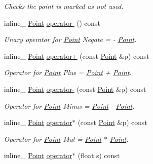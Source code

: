 \begin{DoxyCompactItemize}
\begin{DoxyCompactList}\small\item\em Checks the point is marked as not used. \end{DoxyCompactList}\item 
\hypertarget{class_point_a315d9824eea49c0d240cb9591ee97024}{inline\+\_\+ \hyperlink{class_point}{Point} \hyperlink{class_point_a315d9824eea49c0d240cb9591ee97024}{operator-\/} () const }\label{class_point_a315d9824eea49c0d240cb9591ee97024}

\begin{DoxyCompactList}\small\item\em Unary operator for \hyperlink{class_point}{Point} Negate = -\/ \hyperlink{class_point}{Point}. \end{DoxyCompactList}\item 
\hypertarget{class_point_ae75aa36bd4be5dbcfe682a063927fbf1}{inline\+\_\+ \hyperlink{class_point}{Point} \hyperlink{class_point_ae75aa36bd4be5dbcfe682a063927fbf1}{operator+} (const \hyperlink{class_point}{Point} \&p) const }\label{class_point_ae75aa36bd4be5dbcfe682a063927fbf1}

\begin{DoxyCompactList}\small\item\em Operator for \hyperlink{class_point}{Point} Plus = \hyperlink{class_point}{Point} + \hyperlink{class_point}{Point}. \end{DoxyCompactList}\item 
\hypertarget{class_point_a0cfa198d4ba252ff0a5ea2e0ce5d3a2a}{inline\+\_\+ \hyperlink{class_point}{Point} \hyperlink{class_point_a0cfa198d4ba252ff0a5ea2e0ce5d3a2a}{operator-\/} (const \hyperlink{class_point}{Point} \&p) const }\label{class_point_a0cfa198d4ba252ff0a5ea2e0ce5d3a2a}

\begin{DoxyCompactList}\small\item\em Operator for \hyperlink{class_point}{Point} Minus = \hyperlink{class_point}{Point} -\/ \hyperlink{class_point}{Point}. \end{DoxyCompactList}\item 
\hypertarget{class_point_a0bad2f6e7e2caf7a0e639f3ba0f9bbc8}{inline\+\_\+ \hyperlink{class_point}{Point} \hyperlink{class_point_a0bad2f6e7e2caf7a0e639f3ba0f9bbc8}{operator$\ast$} (const \hyperlink{class_point}{Point} \&p) const }\label{class_point_a0bad2f6e7e2caf7a0e639f3ba0f9bbc8}

\begin{DoxyCompactList}\small\item\em Operator for \hyperlink{class_point}{Point} Mul = \hyperlink{class_point}{Point} $\ast$ \hyperlink{class_point}{Point}. \end{DoxyCompactList}\item 
\hypertarget{class_point_a4b3ce25b1180271c2bc7b33bd2755160}{inline\+\_\+ \hyperlink{class_point}{Point} \hyperlink{class_point_a4b3ce25b1180271c2bc7b33bd2755160}{operator$\ast$} (float s) const }\label{class_point_a4b3ce25b1180271c2bc7b33bd2755160}


\end{DoxyCompactItemize}
